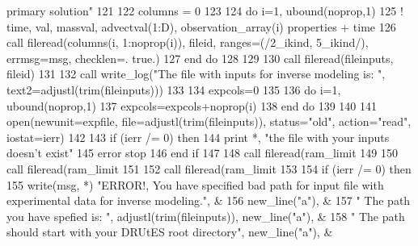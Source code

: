 \begin{DoxyCode}
{       primary solution"}
121       
122       columns = 0
123       
124       \textcolor{keywordflow}{do} i=1, ubound(noprop,1)
125 \textcolor{comment}{!       time, val, massval, advectval(1:D), observation\_array(i)%
       properties + time}
126         \textcolor{keyword}{call }fileread(columns(i, 1:noprop(i)), fileid, ranges=(/2\_ikind,\textcolor{comment}{ 5\_ikind/), errmsg=msg, checklen=.
      true.)}
127 \textcolor{comment}{}\textcolor{keywordflow}{      end do}
128       
129       
130       \textcolor{keyword}{call }fileread(fileinputs, fileid)  
131       
132       \textcolor{keyword}{call }write_log(\textcolor{stringliteral}{"The file with inputs for inverse modeling is: "}, text2\textcolor{comment}{=adjustl(trim(fileinputs)))}
133 \textcolor{comment}{      }
134 \textcolor{comment}{      expcols=0}
135 \textcolor{comment}{      }
136 \textcolor{comment}{      }\textcolor{keywordflow}{do} i=1, ubound(noprop,1)
137         expcols=expcols+noprop(i)
138 \textcolor{keywordflow}{      end do}
139       
140             
141       \textcolor{keyword}{open}(newunit=expfile, file=adjustl(trim(fileinputs)), status=\textcolor{stringliteral}{"old"}\textcolor{comment}{, action=}\textcolor{stringliteral}{"read"}\textcolor{comment}{, iostat=ierr)}
142 \textcolor{comment}{      }
143 \textcolor{comment}{      }\textcolor{keywordflow}{if} (ierr /= 0) \textcolor{keywordflow}{then}
144         print *, \textcolor{stringliteral}{"the file with your inputs doesn't exist"}
145         error stop
146 \textcolor{keywordflow}{      end if}
147       
148       \textcolor{keyword}{call }fileread(ram\_limit%
149       
150       \textcolor{keyword}{call }fileread(ram\_limit%
151       
152       \textcolor{keyword}{call }fileread(ram\_limit%
153 \textcolor{comment}{      }
154 \textcolor{comment}{      }\textcolor{keywordflow}{if} (ierr /= 0) \textcolor{keywordflow}{then}
155         \textcolor{keyword}{write}(msg, *) \textcolor{stringliteral}{"ERROR!, You have specified bad path for input file with experimental data for
       inverse modeling."}\textcolor{comment}{, & }
156 \textcolor{comment}{        new\_line(}\textcolor{stringliteral}{"a"}), &
157         \textcolor{stringliteral}{" The path you have spefied is: "}, adjustl(trim(fileinputs)), new\_line\textcolor{comment}{(}\textcolor{stringliteral}{"a"}\textcolor{comment}{), &}
158 \textcolor{comment}{        }\textcolor{stringliteral}{" The path should start with your DRUtES root directory"}, new\_line\textcolor{comment}{(}\textcolor{stringliteral}{"a"}\textcolor{comment}{), &}

\end{DoxyCode}

